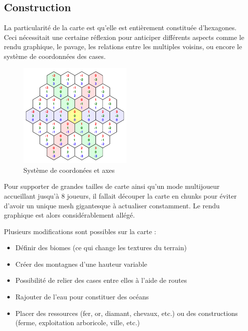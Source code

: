 \documentclass[12pt]{report}
\begin{document}
\subsection{Construction}

La particularité de la carte est qu’elle est entièrement constituée d’hexagones.
Ceci nécessitait une certaine réflexion pour anticiper différents aspects comme
le rendu graphique, le pavage, les relations entre les multiples voisins, ou
encore le système de coordonnées des cases.

\begin{figure}
    \centering
    \includegraphics[width=0.5\textwidth]{../report_1/img/cubic_coordinates}
    \caption*{Système de coordonées et axes}
\end{figure}

Pour supporter de grandes tailles de carte ainsi qu’un mode multijoueur
accueillant jusqu’à 8 joueurs, il fallait découper la carte en chunks pour
éviter d’avoir un unique mesh gigantesque à actualiser constamment. Le rendu
graphique est alors considérablement allégé.

Plusieurs modifications sont possibles sur la carte :

\begin{itemize}
    \item Définir des biomes (ce qui change les textures du terrain)
    \item Créer des montagnes d’une hauteur variable
    \item Possibilité de relier des cases entre elles à l’aide de routes
    \item Rajouter de l’eau pour constituer des océans
    \item Placer des ressources (fer, or, diamant, chevaux, etc.) ou des
        constructions (ferme, exploitation arboricole, ville, etc.)
\end{itemize}
\end{document}
